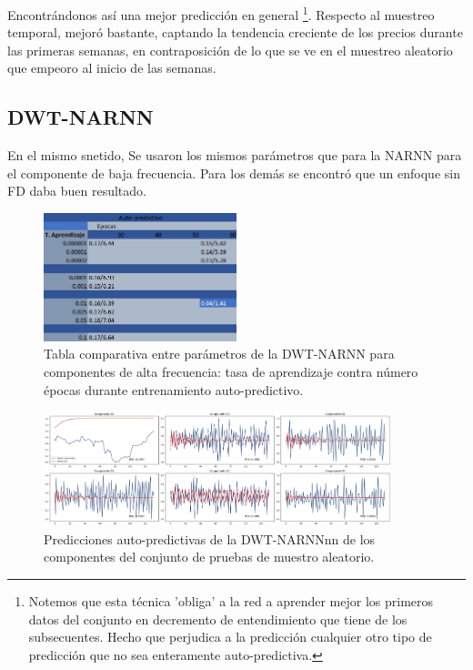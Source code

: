Encontrándonos así una mejor predicción en general \footnote{Notemos que esta técnica 'obliga' a la red a aprender mejor los primeros datos del conjunto en decremento de entendimiento que tiene de los subsecuentes. Hecho que perjudica a la predicción cualquier otro tipo de predicción que no sea enteramente auto-predictiva.}. Respecto al muestreo temporal, mejoró bastante, captando la tendencia creciente de los precios durante las primeras semanas, en contraposición de lo que se ve en el muestreo aleatorio que empeoro al inicio de las semanas.


\subsection{DWT-NARNN}

En el mismo snetido, Se usaron los mismos parámetros que para la NARNN para el componente de baja frecuencia. Para los demás se encontró que un enfoque sin FD daba buen resultado.

\begin{figure}[H]
    \centering
    \includegraphics[width=0.5\textwidth]{Figuras/proceso_de_entrenamiento/lr_epocas_DWT_LSTM_auto_pred.png}
    \caption{Tabla comparativa entre parámetros de la DWT-NARNN para componentes de alta frecuencia: tasa de aprendizaje contra número épocas durante entrenamiento auto-predictivo.} 
    \label{fig:lr_epocas_DWTNARNN_autopred_v2}
\end{figure}

\begin{figure}[H]
    \centering
    \includegraphics[width=0.9\textwidth]{Figuras/proceso_de_entrenamiento/grafs_c_prueba/muestreo_aleatorio/DWT_NARNN/auto_predictiva/DWT_NARNN.png}
    \caption{Predicciones auto-predictivas de la DWT-NARNNnn de los componentes del conjunto de pruebas de muestro aleatorio.} 
    \label{fig:c_prueba_componentes_DWTNARNN_autopred_aleatorio}
\end{figure}

